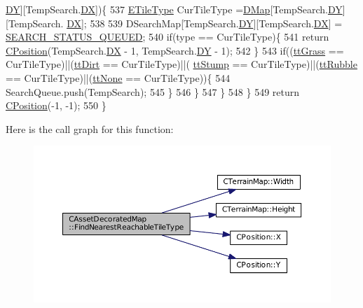 \begin{DoxyCode}
      \hyperlink{structSSearchTile_a5a7b0a0b5d8efc7a01175625a012abd1}{DY}][TempSearch.\hyperlink{structSSearchTile_a08045e94e80c5c6e98f23313139853c6}{DX}])\{
537                 \hyperlink{classCTerrainMap_aff2ab991e237269941416dd79d8871d4}{ETileType} CurTileType =\hyperlink{classCTerrainMap_a80d154ce478948b10473534a7bca13f6}{DMap}[TempSearch.\hyperlink{structSSearchTile_a5a7b0a0b5d8efc7a01175625a012abd1}{DY}][TempSearch.
      \hyperlink{structSSearchTile_a08045e94e80c5c6e98f23313139853c6}{DX}];
538                 
539                 DSearchMap[TempSearch.\hyperlink{structSSearchTile_a5a7b0a0b5d8efc7a01175625a012abd1}{DY}][TempSearch.\hyperlink{structSSearchTile_a08045e94e80c5c6e98f23313139853c6}{DX}] = 
      \hyperlink{AssetDecoratedMap_8cpp_a6491ccf61b14bffb63a14347d9c616e6}{SEARCH\_STATUS\_QUEUED};
540                 \textcolor{keywordflow}{if}(type == CurTileType)\{
541                     \textcolor{keywordflow}{return} \hyperlink{classCPosition}{CPosition}(TempSearch.\hyperlink{structSSearchTile_a08045e94e80c5c6e98f23313139853c6}{DX} - 1, TempSearch.\hyperlink{structSSearchTile_a5a7b0a0b5d8efc7a01175625a012abd1}{DY} - 1);
542                 \}
543                 \textcolor{keywordflow}{if}((\hyperlink{classCTerrainMap_aff2ab991e237269941416dd79d8871d4ae587716ed26a437b6ea33f0ac823d47a}{ttGrass} == CurTileType)||(\hyperlink{classCTerrainMap_aff2ab991e237269941416dd79d8871d4a49fb754039632e7127fca005dd95bab8}{ttDirt} == CurTileType)||(
      \hyperlink{classCTerrainMap_aff2ab991e237269941416dd79d8871d4ac6008e344fb024b62741b2ffaef042ef}{ttStump} == CurTileType)||(\hyperlink{classCTerrainMap_aff2ab991e237269941416dd79d8871d4a0969ea4c56acb3f5acf137c0d06a3371}{ttRubble} == CurTileType)||(\hyperlink{classCTerrainMap_aff2ab991e237269941416dd79d8871d4a481e779132fb16414d17870bd6229eb5}{ttNone} == CurTileType))\{
544                     SearchQueue.push(TempSearch);
545                 \}
546             \}
547         \}
548     \}
549     \textcolor{keywordflow}{return} \hyperlink{classCPosition}{CPosition}(-1, -1);
550 \}
\end{DoxyCode}
Here is the call graph for this function\+:\nopagebreak
\begin{figure}[H]
\begin{center}
\leavevmode
\includegraphics[width=350pt]{classCAssetDecoratedMap_a9e9eed95b427443d196b56b852cdeb9d_cgraph}
\end{center}
\end{figure}
